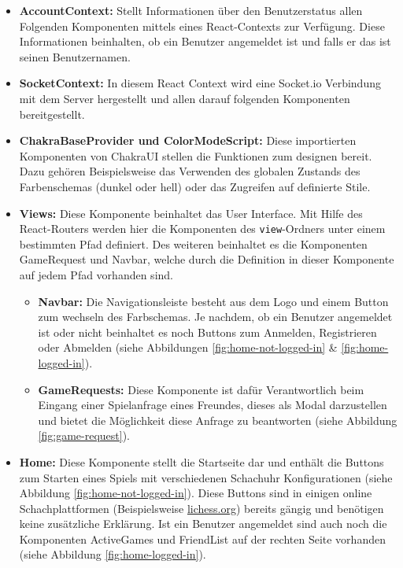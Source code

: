 \begin{itemize}
\item \textbf{AccountContext:} Stellt Informationen über den Benutzerstatus allen Folgenden Komponenten mittels eines React-Contexts zur Verfügung. Diese Informationen beinhalten, ob ein Benutzer angemeldet ist und falls er das ist seinen Benutzernamen.
\item \textbf{SocketContext:} In diesem React Context wird eine Socket.io Verbindung mit dem Server hergestellt und allen darauf folgenden Komponenten bereitgestellt.
\item \textbf{ChakraBaseProvider und ColorModeScript:} Diese importierten Komponenten von ChakraUI stellen die Funktionen zum designen bereit. Dazu gehören Beispielsweise das Verwenden des globalen Zustands des Farbenschemas (dunkel oder hell) oder das Zugreifen auf definierte Stile.
\item \textbf{Views:} Diese Komponente beinhaltet das User Interface. Mit Hilfe des React-Routers werden hier die Komponenten des \verb|view|-Ordners unter einem bestimmten Pfad definiert. Des weiteren beinhaltet es die Komponenten GameRequest und Navbar, welche durch die Definition in dieser Komponente auf jedem Pfad vorhanden sind.
\begin{itemize}
\item \textbf{Navbar:} Die Navigationsleiste besteht aus dem Logo und einem Button zum wechseln des Farbschemas. Je nachdem, ob ein Benutzer angemeldet ist oder nicht beinhaltet es noch Buttons zum Anmelden, Registrieren oder Abmelden (siehe Abbildungen \ref{fig:home-not-logged-in} \& \ref{fig:home-logged-in}).
\item \textbf{GameRequests:} Diese Komponente ist dafür Verantwortlich beim Eingang einer Spielanfrage eines Freundes, dieses als Modal darzustellen und bietet die Möglichkeit diese Anfrage zu beantworten (siehe Abbildung \ref{fig:game-request}).
\end{itemize}
\item \textbf{Home:} Diese Komponente stellt die Startseite dar und enthält die Buttons zum Starten eines Spiels mit verschiedenen Schachuhr Konfigurationen (siehe Abbildung \ref{fig:home-not-logged-in}). Diese Buttons sind in einigen online Schachplattformen (Beispielsweise \url{lichess.org}) bereits gängig und benötigen keine zusätzliche Erklärung. Ist ein Benutzer angemeldet sind auch noch die Komponenten ActiveGames und FriendList auf der rechten Seite vorhanden (siehe Abbildung \ref{fig:home-logged-in}).
\begin{itemize}

\end{itemize}
\end{itemize}
